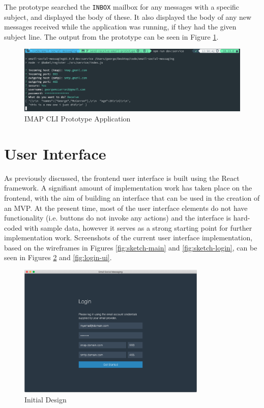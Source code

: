The prototype searched the \texttt{INBOX} mailbox for any messages with a specific subject, and displayed the body of these. It also displayed the body of any new messages received while the application was running, if they had the given subject line. The output from the prototype can be seen in Figure \ref{fig:imap-cli}.

\begin{figure}[h!]
  \centering
  \includegraphics[width=\textwidth]{images/imap-cli.png}
  \caption{IMAP CLI Prototype Application}
  \label{fig:imap-cli}
\end{figure}

\section{User Interface}
As previously discussed, the frontend user interface is built using the React framework. A signifiant amount of implementation work has taken place on the frontend, with the aim of building an interface that can be used in the creation of an MVP. At the present time, most of the user interface elements do not have functionality (i.e. buttons do not invoke any actions) and the interface is hard-coded with sample data, however it serves as a strong starting point for further implementation work. Screenshots of the current user interface implementation, based on the wireframes in Figures \ref{fig:sketch-main} and \ref{fig:sketch-login}, can be seen in Figures \ref{fig:main-ui} and \ref{fig:login-ui}.

\begin{figure}[h!]
  \centering
  \includegraphics[width=0.8\textwidth]{images/implementation-login.png}
  \caption{Initial Design}
  \label{fig:main-ui}
\end{figure}


